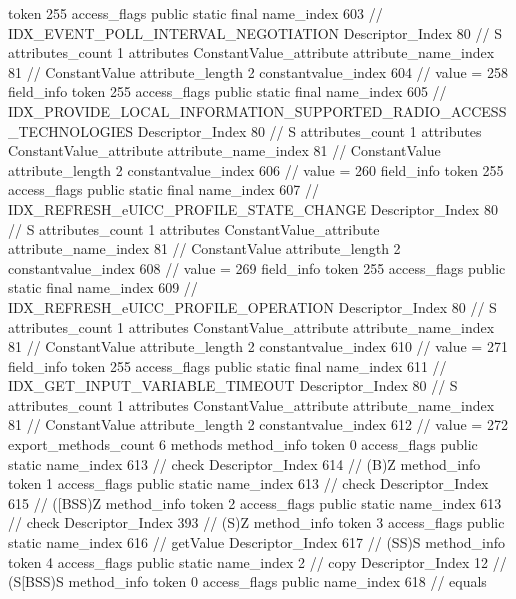 {{{{{				token	255
				access_flags	public static final
				name_index	603		// IDX_EVENT_POLL_INTERVAL_NEGOTIATION
				Descriptor_Index	80		// S
				attributes_count	1
				attributes {
				ConstantValue_attribute {
					attribute_name_index	81		// ConstantValue
					attribute_length	2
					constantvalue_index	604		// value = 258
				}
				}
			}
			field_info {
				token	255
				access_flags	public static final
				name_index	605		// IDX_PROVIDE_LOCAL_INFORMATION_SUPPORTED_RADIO_ACCESS_TECHNOLOGIES
				Descriptor_Index	80		// S
				attributes_count	1
				attributes {
				ConstantValue_attribute {
					attribute_name_index	81		// ConstantValue
					attribute_length	2
					constantvalue_index	606		// value = 260
				}
				}
			}
			field_info {
				token	255
				access_flags	public static final
				name_index	607		// IDX_REFRESH_eUICC_PROFILE_STATE_CHANGE
				Descriptor_Index	80		// S
				attributes_count	1
				attributes {
				ConstantValue_attribute {
					attribute_name_index	81		// ConstantValue
					attribute_length	2
					constantvalue_index	608		// value = 269
				}
				}
			}
			field_info {
				token	255
				access_flags	public static final
				name_index	609		// IDX_REFRESH_eUICC_PROFILE_OPERATION
				Descriptor_Index	80		// S
				attributes_count	1
				attributes {
				ConstantValue_attribute {
					attribute_name_index	81		// ConstantValue
					attribute_length	2
					constantvalue_index	610		// value = 271
				}
				}
			}
			field_info {
				token	255
				access_flags	public static final
				name_index	611		// IDX_GET_INPUT_VARIABLE_TIMEOUT
				Descriptor_Index	80		// S
				attributes_count	1
				attributes {
				ConstantValue_attribute {
					attribute_name_index	81		// ConstantValue
					attribute_length	2
					constantvalue_index	612		// value = 272
				}
				}
			}
			}
			export_methods_count	6
			methods {
				method_info {
					token	0
					access_flags	public static
					name_index	613		// check
					Descriptor_Index	614		// (B)Z
				}
				method_info {
					token	1
					access_flags	public static
					name_index	613		// check
					Descriptor_Index	615		// ([BSS)Z
				}
				method_info {
					token	2
					access_flags	public static
					name_index	613		// check
					Descriptor_Index	393		// (S)Z
				}
				method_info {
					token	3
					access_flags	public static
					name_index	616		// getValue
					Descriptor_Index	617		// (SS)S
				}
				method_info {
					token	4
					access_flags	public static
					name_index	2		// copy
					Descriptor_Index	12		// (S[BSS)S
				}
				method_info {
					token	0
					access_flags	public
					name_index	618		// equals
}}}}}
